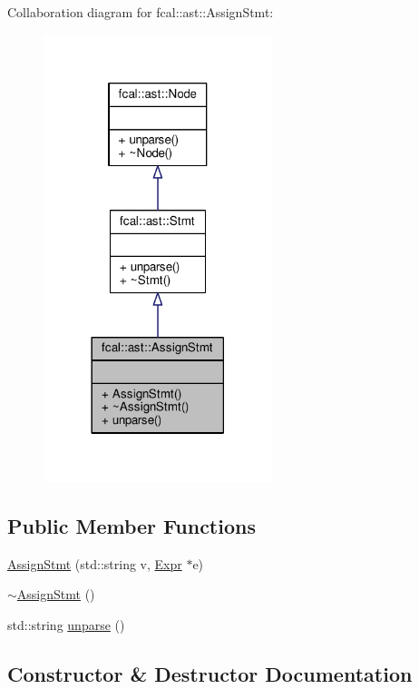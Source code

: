 Collaboration diagram for fcal\+:\+:ast\+:\+:Assign\+Stmt\+:
\nopagebreak
\begin{figure}[H]
\begin{center}
\leavevmode
\includegraphics[width=189pt]{classfcal_1_1ast_1_1AssignStmt__coll__graph}
\end{center}
\end{figure}
\subsection*{Public Member Functions}
\begin{DoxyCompactItemize}
\item 
\hyperlink{classfcal_1_1ast_1_1AssignStmt_aa307bda28c28b25f884cdc83cd90ec87}{Assign\+Stmt} (std\+::string v, \hyperlink{classfcal_1_1ast_1_1Expr}{Expr} $\ast$e)
\item 
\hyperlink{classfcal_1_1ast_1_1AssignStmt_afa239c50a03eb775be4429d5629a5217}{$\sim$\+Assign\+Stmt} ()
\item 
std\+::string \hyperlink{classfcal_1_1ast_1_1AssignStmt_ae58f8af8bc26ae0994d95ae266433ded}{unparse} ()
\end{DoxyCompactItemize}


\subsection{Constructor \& Destructor Documentation}
